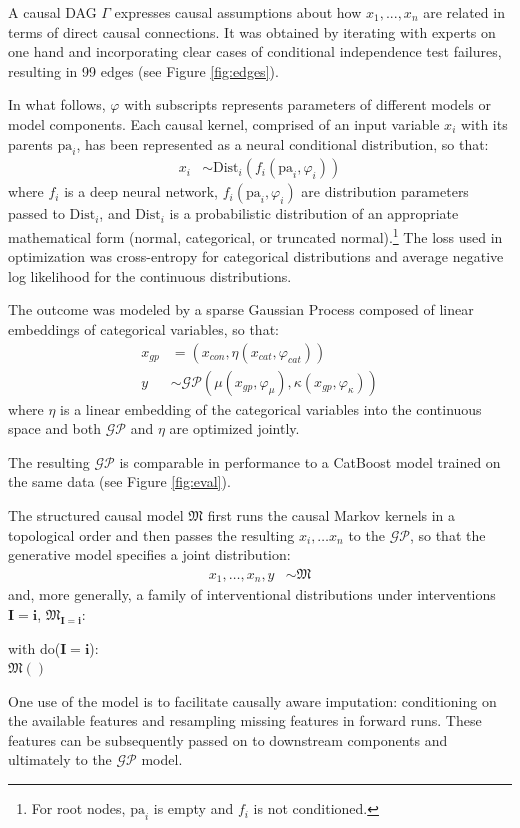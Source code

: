 \documentclass[anon,12pt]{clear2025} %
\begin{document}
A causal DAG $\Gamma$ expresses causal assumptions about how $x_1, ...,x_n$ are related in terms of direct causal connections. It was obtained by iterating with experts on one hand and incorporating clear cases of conditional independence test failures, resulting in 99 edges (see Figure \ref{fig:edges}).





In what follows, $\varphi$ with subscripts represents parameters of different models or model components. Each causal kernel, comprised of an input variable $x_i$ with its parents $\mathrm{pa}_i$, has been represented as a neural conditional distribution, so that:
\begin{align}
x_i & \sim \mathrm{Dist}_i(f_i(\mathrm{pa}_i, \varphi_i))
\end{align}
\noindent where $f_i$ is a deep neural network, $f_i(\mathrm{pa}_i, \varphi_i)$ are distribution parameters passed to $\mathrm{Dist}_i$, and $\mathrm{Dist}_i$ is a probabilistic distribution of an appropriate mathematical form (normal, categorical, or truncated normal).\footnote{For root nodes, $\mathrm{pa}_i$ is empty and $f_i$ is not conditioned.} The loss used in optimization was cross-entropy for categorical distributions and average negative log likelihood for the continuous distributions.


The outcome was modeled by a sparse Gaussian Process composed of linear embeddings of categorical variables, so that:
\begin{align}
x_{gp} & = (x_{con}, \eta(x_{cat}, \varphi_{cat}) ) \\
y & \sim \mathcal{GP}\left(\mu(x_{gp}, \varphi_\mu), \kappa(x_{gp}, \varphi_\kappa)\right)
\end{align}
\noindent where $\eta$ is a linear embedding of the categorical variables into the continuous space and both $\mathcal{GP}$ and $\eta$ are optimized jointly.

The resulting $\mathcal{GP}$ is comparable in performance to a CatBoost model trained on the same data (see Figure \ref{fig:eval}).




The structured causal model $\mathfrak{M}$ first runs the causal Markov kernels in a topological order and then passes the resulting $x_i, \ldots x_n$ to the $\mathcal{GP}$, so that the generative model specifies a joint distribution:
\begin{align*}
x_1, \dots, x_n, y &\sim \mathfrak{M}
\end{align*}
\noindent and, more generally, a family of interventional distributions under interventions $\mathbf{I}=\mathbf{i}$, $\mathfrak{M}_{\mathbf{I}=\mathbf{i}}$:
\begin{docode}
    with do($\mathbf{I}=\mathbf{i}$):\\
    \hspace*{2em} $\mathfrak{M}()$
\end{docode}
One use of the model is to facilitate causally aware imputation: conditioning on the available features and resampling missing features in forward runs. These features can be subsequently passed on to downstream components and ultimately to the $\mathcal{GP}$ model.
\end{document}
